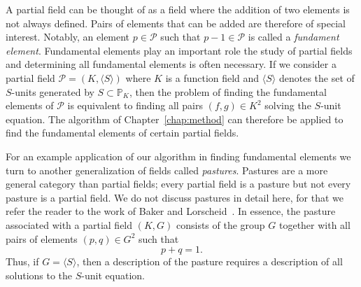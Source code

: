 A partial field can be thought of as a field where the addition of two elements is not always defined. Pairs of elements that can be added are therefore of special interest. Notably, an element \(p \in \mathcal{P}\) such that \(p - 1 \in \mathcal{P}\) is called a \textit{fundament element}. Fundamental elements play an important role the study of partial fields and determining all fundamental elements is often necessary. If we consider a partial field \(\mathcal{P} = (K, \langle S \rangle)\) where \(K\) is a function field and \(\langle S \rangle\) denotes the set of \(S\)-units generated by \(S \subset \mathbb{P}_{K}\), then the problem of finding the fundamental elements of \(\mathcal{P}\) is equivalent to finding all pairs \((f, g) \in K^{2}\) solving the \(S\)-unit equation. The algorithm of Chapter~\ref{chap:method} can therefore be applied to find the fundamental elements of certain partial fields.

For an example application of our algorithm in finding fundamental elements we turn to another generalization of fields called \textit{pastures}. Pastures are a more general category than partial fields; every partial field is a pasture but not every pasture is a partial field. We do not discuss pastures in detail here, for that we refer the reader to the work of Baker and Lorscheid~\cite{baker-2020-foundations-of-matroids}. In essence, the pasture associated with a partial field \((K, G)\) consists of the group \(G\) together with all pairs of elements \((p, q) \in G^{2}\) such that
\[p + q = 1.\]
Thus, if \(G = \langle S \rangle\), then a description of the pasture requires a description of all solutions to the \(S\)-unit equation.

